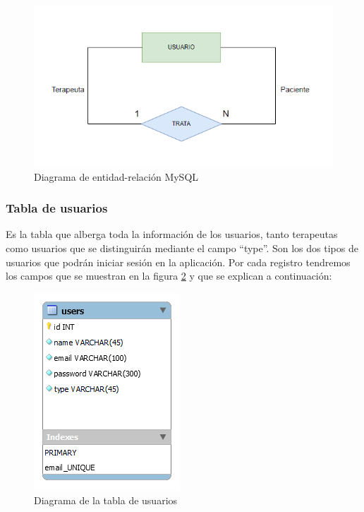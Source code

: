 \begin{figure}[h]
	\centering
	\includegraphics[scale=1.0]{Imagenes/Vectorial/diagrama_entidad_relacion_mysql}
	\caption{Diagrama de entidad-relación MySQL}
	\label{fig:diagramaEER}
\end{figure}

\subsubsection{Tabla de usuarios}
Es la tabla que alberga toda la información de los usuarios, tanto terapeutas como usuarios que se distinguirán mediante el campo ``type''.
Son los dos tipos de usuarios que podrán iniciar sesión en la aplicación. Por cada registro tendremos los campos que se muestran en la figura \ref{fig:diagramatablausers} y que se explican a continuación:

\begin{figure}[h]
	\centering
	\includegraphics[scale=1.0]{Imagenes/Vectorial/diagrama_tabla_users}
	\caption{Diagrama de la tabla de usuarios}
	\label{fig:diagramatablausers}
\end{figure}

